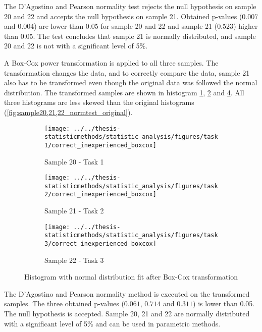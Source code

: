 The D'Agostino and Pearson normality test rejects the null hypothesis on sample 20 and 22 and accepts the null hypothesis on sample 21. Obtained p-values ($0.007$ and $0.004$) are lower than 0.05 for sample 20 and 22 and sample 21 ($0.523$) higher than 0.05. The test concludes that sample 21 is normally distributed, and sample 20 and 22 is not with a significant level of 5\%. \newline

A Box-Cox power transformation is applied to all three samples. The transformation changes the data, and to correctly compare the data, sample 21 also has to be transformed even though the original data was followed the normal distribution. The transformed samples are shown in histogram \ref{fig:correctinexperiencedboxcox_task1}, \ref{fig:correctinexperiencedboxcox_task2} and \ref{fig:correctinexperiencedboxcox_task3}. All three histograms are less skewed than the original histograms (\ref{fig:sample20,21,22_normtest_original}).

\begin{figure}[H]
	\centering
	\begin{subfigure}[b]{0.32\textwidth}
		\centering
		\texttt{[image: ../../thesis-statisticmethods/statistic\_analysis/figures/task1/correct\_inexperienced\_boxcox]}
		\caption{Sample 20 - Task 1}
		\label{fig:correctinexperiencedboxcox_task1}
	\end{subfigure}
	\begin{subfigure}[b]{0.32\textwidth}
		\centering
		\texttt{[image: ../../thesis-statisticmethods/statistic\_analysis/figures/task2/correct\_inexperienced\_boxcox]}
		\caption{Sample 21 - Task 2}
		\label{fig:correctinexperiencedboxcox_task2}
	\end{subfigure}
	\begin{subfigure}[b]{0.32\textwidth}
		\centering
		\texttt{[image: ../../thesis-statisticmethods/statistic\_analysis/figures/task3/correct\_inexperienced\_boxcox]}
		\caption{Sample 22 - Task 3}
		\label{fig:correctinexperiencedboxcox_task3}
	\end{subfigure}
	\caption{Histogram with normal distribution fit after Box-Cox transformation}
\end{figure}

The D'Agostino and Pearson normality method is executed on the transformed samples. The three obtained p-values ($0.061$, $0.714$ and $0.311$) is lower than 0.05. The null hypothesis is accepted. Sample 20, 21 and 22 are normally distributed with a significant level of 5\% and can be used in parametric methods.  

